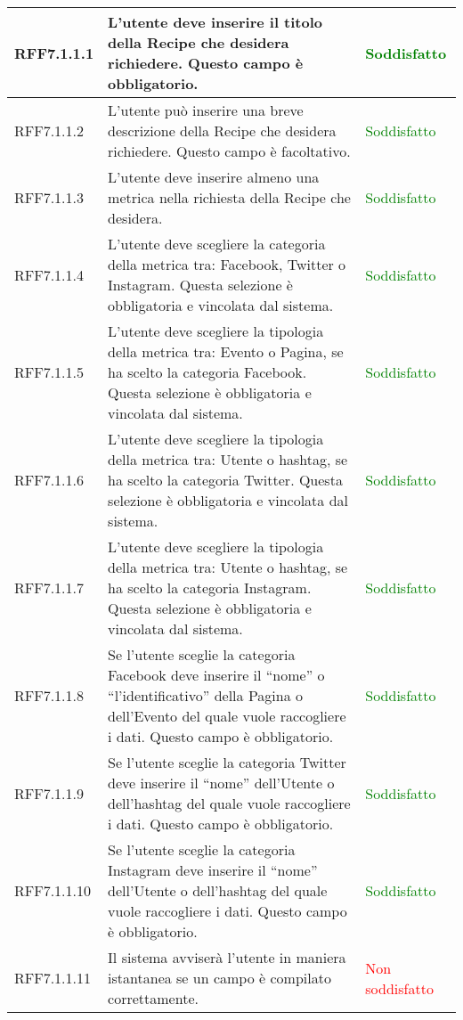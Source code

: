 \begin{center}
\begin{longtable}{| p{2.5cm} | p{8cm} | p{3.5cm} |}
		\hline
		RFF7.1.1.1 & L'utente deve inserire il titolo della Recipe che desidera richiedere. Questo campo è obbligatorio. & \textcolor{green}{Soddisfatto} \\
		\hline
		RFF7.1.1.2 & L'utente può inserire una breve descrizione della Recipe che desidera richiedere. Questo campo è facoltativo. & \textcolor{green}{Soddisfatto} \\
		\hline
		RFF7.1.1.3 & L'utente deve inserire almeno una metrica nella richiesta della Recipe che desidera. & \textcolor{green}{Soddisfatto} \\
		\hline
		RFF7.1.1.4 & L'utente deve scegliere la categoria della metrica tra: Facebook, Twitter o Instagram. Questa selezione è obbligatoria e vincolata dal sistema. & \textcolor{green}{Soddisfatto} \\
		\hline
		RFF7.1.1.5 & L'utente deve scegliere la tipologia della metrica tra: Evento o Pagina, se ha scelto la categoria Facebook. Questa selezione è obbligatoria e vincolata dal sistema. & \textcolor{green}{Soddisfatto} \\
		\hline
		RFF7.1.1.6 & L'utente deve scegliere la tipologia della metrica tra: Utente o hashtag, se ha scelto la categoria Twitter. Questa selezione è obbligatoria e vincolata dal sistema. & \textcolor{green}{Soddisfatto} \\
		\hline
		RFF7.1.1.7 & L'utente deve scegliere la tipologia della metrica tra: Utente o hashtag, se ha scelto la categoria Instagram. Questa selezione è obbligatoria e vincolata dal sistema. & \textcolor{green}{Soddisfatto} \\
		\hline
		RFF7.1.1.8 & Se l'utente sceglie la categoria Facebook deve inserire il ``nome'' o ``l'identificativo'' della Pagina o dell'Evento del quale vuole raccogliere i dati. Questo campo è obbligatorio. & \textcolor{green}{Soddisfatto} \\
		\hline
		RFF7.1.1.9 & Se l'utente sceglie la categoria Twitter deve inserire il ``nome'' dell'Utente o dell'hashtag del quale vuole raccogliere i dati. Questo campo è obbligatorio. & \textcolor{green}{Soddisfatto} \\
		\hline
		RFF7.1.1.10 & Se l'utente sceglie la categoria Instagram deve inserire il ``nome'' dell'Utente o dell'hashtag del quale vuole raccogliere i dati. Questo campo è obbligatorio. & \textcolor{green}{Soddisfatto} \\
		\hline
		RFF7.1.1.11 & Il sistema avviserà l'utente in maniera istantanea se un campo è compilato correttamente. & \textcolor{red}{ Non soddisfatto} \\

\end{longtable}
\end{center}
